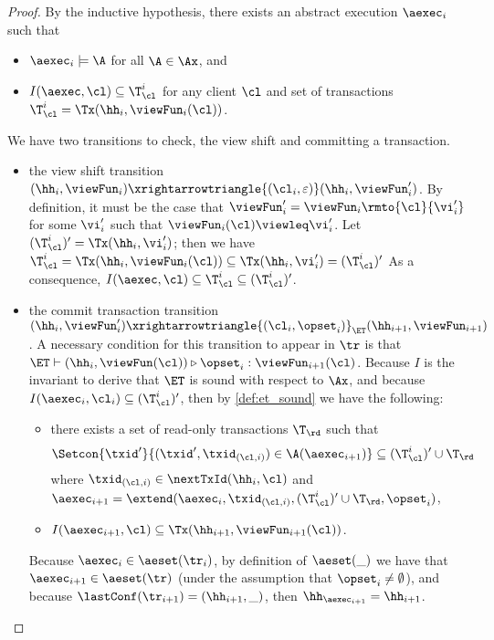\begin{proof}
By the inductive hypothesis, there exists an abstract execution $\aexec_i$ such that  
\begin{itemize}
\item $\aexec_{i} \models \A$ for all $\A \in \Ax$, and 
\item $I(\aexec, \cl) \subseteq \T_{\cl}^{i}$ for any client $\cl$ and set of transactions $\T_{\cl}^{i} = \Tx(\hh_{i}, \viewFun_{i}(\cl))$.
\end{itemize}

We have two transitions to check, the view shift and committing a transaction.
\begin{itemize}
\item the view shift transition $(\hh_{i}, \viewFun_{i}) \xrightarrowtriangle{(\cl_{i}, \varepsilon)} (\hh_{i}, \viewFun'_{i})$. 
By definition, it must be the case that $\viewFun'_{i} = \viewFun_{i}\rmto{\cl}{\vi'_{i}}$ 
for some $\vi'_{i}$ such that $\viewFun_{i}(\cl) \viewleq \vi'_{i}$.
Let $(\T_{\cl}^{i})' = \Tx(\hh_{i}, \vi'_{i})$; then we have 
\(
\T_{\cl}^{i} = \Tx(\hh_{i}, \viewFun_{i}(\cl)) \subseteq \Tx(\hh_{i}, \vi'_{i}) = (\T_{\cl}^{i})'
\)
As a consequence, $I(\aexec, \cl) \subseteq \T_{\cl}^{i} \subseteq (\T_{\cl}^{i})'$.

\item the commit transaction transition $(\hh_{i}, \viewFun_{i}') \xrightarrowtriangle{(\cl_{i}, \opset_{i})}_{\ET} 
(\hh_{i+1}, \viewFun_{i+1})$.
A necessary condition for this transition 
to appear in $\tr$ is that $\ET \vdash (\hh_{i}, \viewFun(\cl)) \triangleright \opset_{i}: \viewFun_{i+1}(\cl)$. 
Because $I$ is the invariant to derive that $\ET$ is sound with respect to $\Ax$, 
and because $I(\aexec_{i}, \cl_{i}) \subseteq (\T^{i}_{\cl})'$, 
then by \cref{def:et_sound} we have the following:
\begin{itemize}
\item there exists a set of read-only transactions $\T_\rd$ 
    such that 
    \[
        \Setcon{\txid' }{ (\txid', \txid_{(\cl, i)}) \in \A(\aexec_{i+1})} \subseteq (\T^{i}_{\cl})' \cup \T_\rd
    \]
where 
$\txid_{(\cl, i)} \in \nextTxId(\hh_{i}, \cl)$
and $\aexec_{i+1} = \extend(\aexec_{i}, \txid_{(\cl, i)}, (\T^{i}_{\cl})' \cup \T_\rd, \opset_{i})$,
\item  $I(\aexec_{i+1}, \cl) \subseteq \Tx(\hh_{i+1}, \viewFun_{i+1}(\cl))$.
\end{itemize} 
Because $\aexec_{i} \in \aeset(\tr_{i})$, by definition of $\aeset(\_)$ we have that 
$\aexec_{i+1} \in \aeset(\tr)$ (under the assumption that $\opset_{i} \neq \emptyset$), 
and because $\lastConf(\tr_{i+1}) = (\hh_{i+1}, \_)$, then $\hh_{\aexec_{i+1}} = \hh_{i+1}$. 


\end{itemize}
\end{proof}
